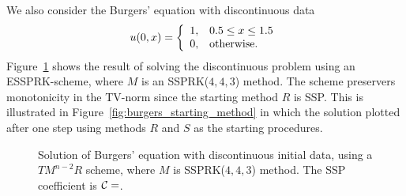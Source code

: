 We also consider the Burgers' equation with discontinuous data
\begin{equation}\label{eq:burgers_discont_IC}
    u(0,x)  = \left\{
                \begin{array}{ll}
                  1, & \hbox{$0.5 \leq x \leq 1.5$} \\
                  0, & \hbox{otherwise.}
                \end{array}
              \right.
\end{equation}
Figure~\ref{fig:burgers_discont} shows the result of solving the 
discontinuous problem using an ESSPRK-scheme, where $M$ is an 
SSPRK($4,4,3$) method. 
The scheme preservers monotonicity in the TV-norm since the starting 
method $R$ is SSP. 
This is illustrated in Figure~\ref{fig:burgers_starting_method} in which 
the solution plotted after one step using methods $R$ and $S$ as the 
starting procedures.

\begin{figure}[t!]
    \centering
    \caption{Solution of Burgers' equation with discontinuous initial data, using a 
    $TM^{n-2}R$ scheme, where $M$ is SSPRK($4,4,3$) method. 
    The SSP coefficient is $ \mathcal{C} = $.}
    \label{fig:burgers_discont}
\end{figure}

